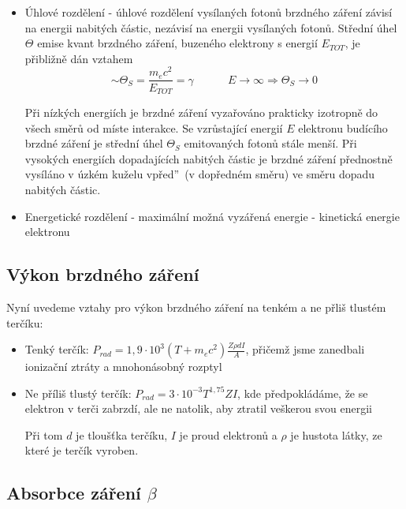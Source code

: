 \documentclass[../../main.tex]{subfiles}
\begin{document}
\begin{itemize}
	\item Úhlové rozdělení - úhlové rozdělení vysílaných fotonů brzdného záření závisí na energii nabitých částic, nezávisí na energii vysílaných fotonů. Střední úhel $\varTheta$ emise kvant brzdného záření, buzeného elektrony s energií $E_{TOT}$, je přibližně dán vztahem
	\begin{equation}
	\sim \varTheta_S = \dfrac{m_e c^2}{E_{TOT}} = \gamma ~~~~~~~~~~~~~~ E \longrightarrow \infty \Rightarrow \varTheta_S \longrightarrow 0
	\end{equation}
	
	Při nízkých energiích je brzdné záření vyzařováno prakticky izotropně do všech směrů od míste interakce. Se vzrůstající energií $E$ elektronu budícího brzdné záření je střední úhel $\varTheta_S$ emitovaných fotonů stále menší. Při vysokých energiích dopadajících nabitých částic je brzdné záření přednostně vysíláno v úzkém kuželu \quotedblbase vpřed\textquotedblright ~(v dopředném směru) ve směru dopadu nabitých částic.
	
	\item Energetické rozdělení - maximální možná vyzářená energie - kinetická energie elektronu
\end{itemize}	

\subsection{Výkon brzdného záření}

Nyní uvedeme vztahy pro výkon brzdného záření na tenkém a ne přliš tlustém terčíku:
\begin{itemize}
	\item Tenký terčík: $P_{rad} = 1,9 \cdotp 10^3 (T + m_e c^2) \frac{Z \rho d I}{A}$, přičemž jsme zanedbali ionizační ztráty a mnohonásobný rozptyl
	\item Ne příliš tlustý terčík: $P_{rad} = 3\cdotp10^{-3} T^{1,75} Z I$, kde předpokládáme, že se elektron v terči zabrzdí, ale ne natolik, aby ztratil veškerou svou energii
	
Při tom $d$ je tloušťka terčíku, $I$ je proud elektronů a $\rho$ je hustota látky, ze které je terčík vyroben.	
\end{itemize}

\subsection{Absorbce záření $\beta$}
\end{document}
